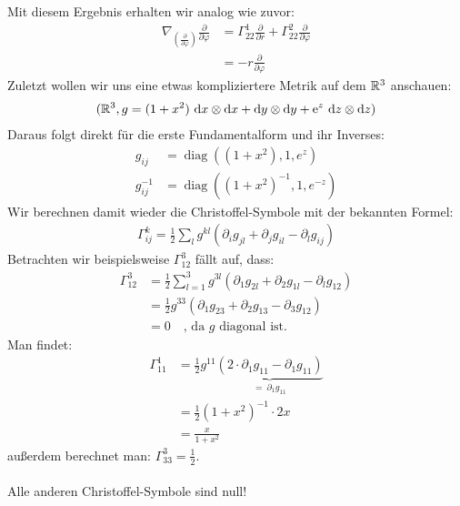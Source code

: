 Mit diesem Ergebnis erhalten wir analog wie zuvor:
\begin{align*}
\nabla_{(\frac{\partial}{\partial\varphi})}\frac{\partial}{\partial\varphi} &= \Gamma_{22}^1\frac{\partial}{\partial r} + \Gamma_{22}^2\frac{\partial}{\partial\varphi}\\
&= -r \frac{\partial}{\partial\varphi}
\end{align*}
Zuletzt wollen wir uns eine etwas kompliziertere Metrik auf dem $\mathbb{R}^3$ anschauen:
\begin{align*}
(\mathbb{R}^3, g= (1+x^2)\ \dd x\otimes \dd x + \dd y \otimes \dd y + \mathrm{e}^z \ \dd z \otimes \dd z)
\end{align*}
Daraus folgt direkt für die erste Fundamentalform und ihr Inverses:
\begin{align*}
g_{ij} &= \operatorname{diag}((1+x^2), 1, e^z) \\
g_{ij}^{-1} &= \operatorname{diag}((1+x^2)^{-1}, 1, e^{-z})
\end{align*}
Wir berechnen damit wieder die Christoffel-Symbole mit der bekannten Formel:
\begin{align*}
\Gamma_{ij}^k= \frac{1}{2}\sum_l g^{kl}(\partial_ig_{jl} + \partial_jg_{il}-\partial_lg_{ij})
\end{align*}
Betrachten wir beispielsweise $\Gamma_{12}^3$ fällt auf, dass:
\begin{align*}
\Gamma_{12}^3 &=  \frac{1}{2}\sum_{l=1}^{3} g^{3l}(\partial_1g_{2l} + \partial_2g_{1l}-\partial_lg_{12}) \\
&=  \frac{1}{2}g^{33}(\partial_1g_{23} + \partial_2g_{13}-\partial_3g_{12}) \\
&= 0 \quad \text{, da $g$ diagonal ist.}
\end{align*}
Man findet:
\begin{align*}
\Gamma_{11}^1 &=  \frac{1}{2} g^{11}\underbrace{(2\cdot\partial_1g_{11} -\partial_1g_{11})}_{ = \  \partial_1g_{11} } \\
&= \frac{1}{2} (1+x^2)^{-1}\cdot 2x \\
&= \frac{x}{1+x^2}
\end{align*}
außerdem berechnet man: \quad $\Gamma_{33}^3 = \frac{1}{2}$. \\
\phantom{.} \\
 Alle anderen Christoffel-Symbole sind null!